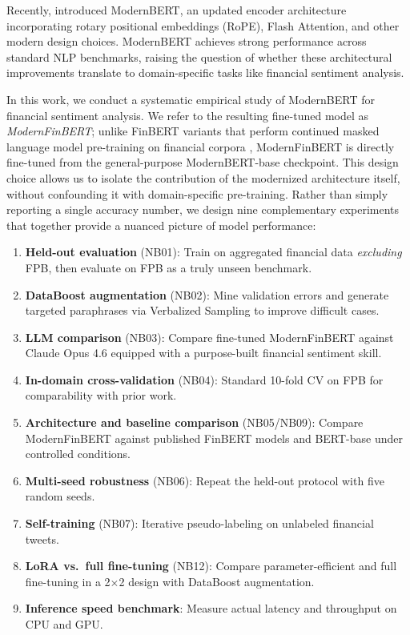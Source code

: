 \documentclass[11pt]{article}
\begin{document}
Recently, \citet{warner2024modernbert} introduced ModernBERT, an updated encoder architecture incorporating rotary positional embeddings (RoPE), Flash Attention, and other modern design choices. ModernBERT achieves strong performance across standard NLP benchmarks, raising the question of whether these architectural improvements translate to domain-specific tasks like financial sentiment analysis.

In this work, we conduct a systematic empirical study of ModernBERT for financial sentiment analysis. We refer to the resulting fine-tuned model as \emph{ModernFinBERT}; unlike FinBERT variants that perform continued masked language model pre-training on financial corpora \citep{araci2019finbert, liu2020finbert}, ModernFinBERT is directly fine-tuned from the general-purpose ModernBERT-base checkpoint. This design choice allows us to isolate the contribution of the modernized architecture itself, without confounding it with domain-specific pre-training. Rather than simply reporting a single accuracy number, we design nine complementary experiments that together provide a nuanced picture of model performance:

\begin{enumerate}[nosep]
    \item \textbf{Held-out evaluation} (NB01): Train on aggregated financial data \emph{excluding} FPB, then evaluate on FPB as a truly unseen benchmark.
    \item \textbf{DataBoost augmentation} (NB02): Mine validation errors and generate targeted paraphrases via Verbalized Sampling \citep{zhang2025verbalized} to improve difficult cases.
    \item \textbf{LLM comparison} (NB03): Compare fine-tuned ModernFinBERT against Claude Opus 4.6 equipped with a purpose-built financial sentiment skill.
    \item \textbf{In-domain cross-validation} (NB04): Standard 10-fold CV on FPB for comparability with prior work.
    \item \textbf{Architecture and baseline comparison} (NB05/NB09): Compare ModernFinBERT against published FinBERT models and BERT-base under controlled conditions.
    \item \textbf{Multi-seed robustness} (NB06): Repeat the held-out protocol with five random seeds.
    \item \textbf{Self-training} (NB07): Iterative pseudo-labeling on unlabeled financial tweets.
    \item \textbf{LoRA vs.\ full fine-tuning} (NB12): Compare parameter-efficient and full fine-tuning in a 2$\times$2 design with DataBoost augmentation.
    \item \textbf{Inference speed benchmark}: Measure actual latency and throughput on CPU and GPU.
\end{enumerate}
\end{document}
